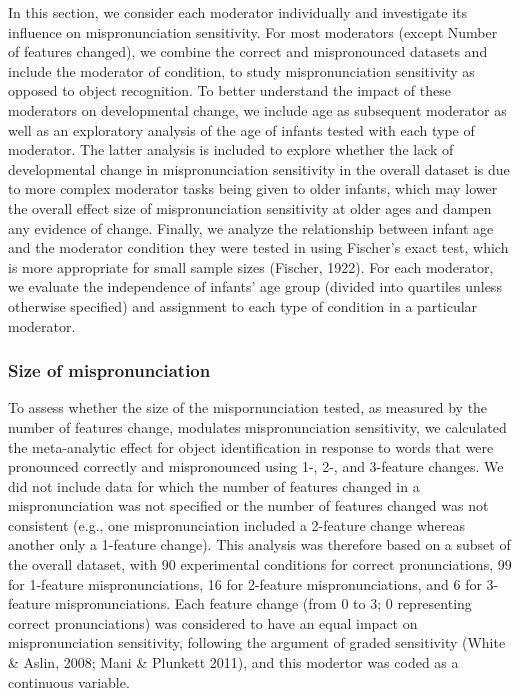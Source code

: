 \documentclass[man]{apa6}
\theoremstyle{definition}
\theoremstyle{definition}
\theoremstyle{definition}
\theoremstyle{remark}
\begin{document}
In this section, we consider each moderator individually and investigate
its influence on mispronunciation sensitivity. For most moderators
(except Number of features changed), we combine the correct and
mispronounced datasets and include the moderator of condition, to study
mispronunciation sensitivity as opposed to object recognition. To better
understand the impact of these moderators on developmental change, we
include age as subsequent moderator as well as an exploratory analysis
of the age of infants tested with each type of moderator. The latter
analysis is included to explore whether the lack of developmental change
in mispronunciation sensitivity in the overall dataset is due to more
complex moderator tasks being given to older infants, which may lower
the overall effect size of mispronunciation sensitivity at older ages
and dampen any evidence of change. Finally, we analyze the relationship
between infant age and the moderator condition they were tested in using
Fischer's exact test, which is more appropriate for small sample sizes
(Fischer, 1922). For each moderator, we evaluate the independence of
infants' age group (divided into quartiles unless otherwise specified)
and assignment to each type of condition in a particular moderator.

\subsubsection{Size of mispronunciation}\label{size-of-mispronunciation}

To assess whether the size of the mispornunciation tested, as measured
by the number of features change, modulates mispronunciation
sensitivity, we calculated the meta-analytic effect for object
identification in response to words that were pronounced correctly and
mispronounced using 1-, 2-, and 3-feature changes. We did not include
data for which the number of features changed in a mispronunciation was
not specified or the number of features changed was not consistent
(e.g., one mispronunciation included a 2-feature change whereas another
only a 1-feature change). This analysis was therefore based on a subset
of the overall dataset, with 90 experimental conditions for correct
pronunciations, 99 for 1-feature mispronunciations, 16 for 2-feature
mispronunciations, and 6 for 3-feature mispronunciations. Each feature
change (from 0 to 3; 0 representing correct pronunciations) was
considered to have an equal impact on mispronunciation sensitivity,
following the argument of graded sensitivity (White \& Aslin, 2008; Mani
\& Plunkett 2011), and this modertor was coded as a continuous variable.
\end{document}
